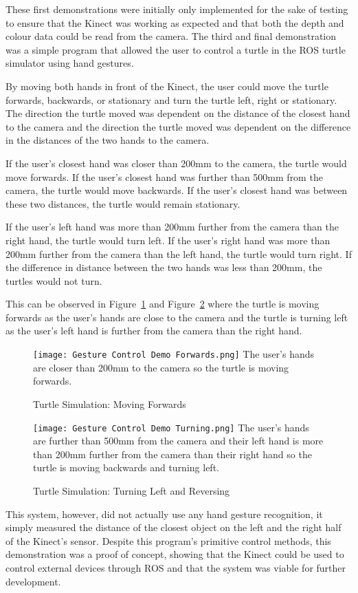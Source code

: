 These first demonstrations were initially only implemented for the sake of testing to ensure that the Kinect was working as expected and that both the depth and colour data could be read from the camera.
The third and final demonstration was a simple program that allowed the user to control a turtle in the ROS turtle simulator using hand gestures.

By moving both hands in front of the Kinect, the user could move the turtle forwards, backwards, or stationary and turn the turtle left, right or stationary.
The direction the turtle moved was dependent on the distance of the closest hand to the camera and the direction the turtle moved was dependent on the difference in the distances of the two hands to the camera.

If the user's closest hand was closer than 200mm to the camera, the turtle would move forwards.\newline
If the user's closest hand was further than 500mm from the camera, the turtle would move backwards.\newline
If the user's closest hand was between these two distances, the turtle would remain stationary.

If the user's left hand was more than 200mm further from the camera than the right hand, the turtle would turn left.\newline
If the user's right hand was more than 200mm further from the camera than the left hand, the turtle would turn right.\newline
If the difference in distance between the two hands was less than 200mm, the turtles would not turn.

This can be observed in Figure~\ref{fig:turtle_fwd} and Figure~\ref{fig:turtle_turn} where the turtle is moving forwards as the user's hands are close to the camera and the turtle is turning left as the user's left hand is further from the camera than the right hand.

\begin{figure}[!htb]
    \caption{Turtle Simulation: Moving Forwards}
    \texttt{[image: Gesture Control Demo Forwards.png]}
    \small
    The user's hands are closer than 200mm to the camera so the turtle is moving forwards.
    \label{fig:turtle_fwd}
\end{figure}

\begin{figure}[!htb]
    \caption{Turtle Simulation: Turning Left and Reversing}
    \texttt{[image: Gesture Control Demo Turning.png]}
    \small
    The user's hands are further than 500mm from the camera and their left hand is more than 200mm further from the camera than their right hand so the turtle is moving backwards and turning left.
    \label{fig:turtle_turn}
\end{figure}

This system, however, did not actually use any hand gesture recognition, it simply measured the distance of the closest object on the left and the right half of the Kinect's sensor.
Despite this program's primitive control methods, this demonstration was a proof of concept, showing that the Kinect could be used to control external devices through ROS and that the system was viable for further development.